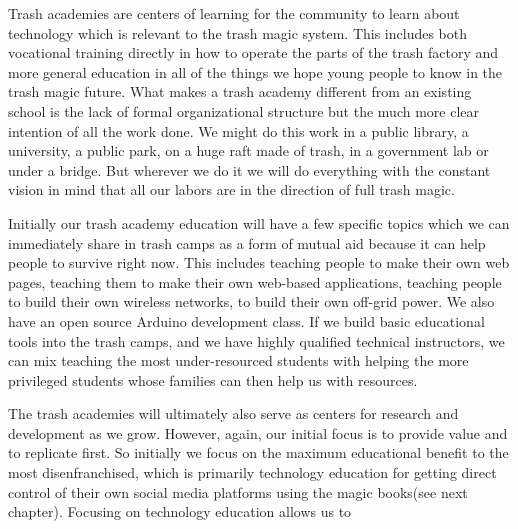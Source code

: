 Trash academies are centers of learning for the community to learn about technology which is relevant to the trash magic system.  This includes both vocational training directly in how to operate the parts of the trash factory and more general education in all of the things we hope young people to know in the trash magic future.  What makes a trash academy different from an existing school is the lack of formal organizational structure but the much more clear intention of all the work done.  We might do this work in a public library, a university, a public park, on a huge raft made of trash, in a government lab or under a bridge. But wherever we do it we will do everything with the constant vision in mind that all our labors are in the direction of full trash magic.

Initially our trash academy education will have a few specific topics which we can immediately share in trash camps as a form of mutual aid because it can help people to survive right now.  This includes teaching people to make their own web pages, teaching them to make their own web-based applications, teaching people to build their own wireless networks, to build their own off-grid power.  We also have an open source Arduino development class.  If we build basic educational tools into the trash camps, and we have highly qualified technical instructors, we can mix teaching the most under-resourced students with helping the more privileged students whose families can then help us with resources.  

The trash academies will ultimately also serve as centers for research and development as we grow.  However, again, our initial focus is to provide value and to replicate first.  So initially we focus on the maximum educational benefit to the most disenfranchised, which is primarily technology education for getting direct control of their own social media platforms using the magic books(see next chapter).  Focusing on technology education allows us to 

